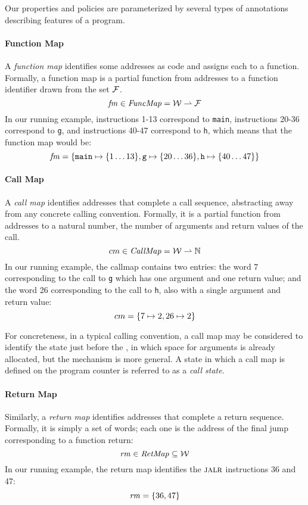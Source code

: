 \documentclass[acmsmall,review,anonymous]{acmart}\settopmatter{printfolios=true,printccs=false,printacmref=false}
\begin{document}
Our properties and policies are parameterized by several types of
annotations describing features of a program.

\paragraph*{Function Map}

A {\em function map} identifies some addresses as code and assigns
each to a function. Formally, a function map is a
partial function from addresses to a function
identifier drawn from the set \(\mathcal{F}\).
\[\mathit{fm} \in \mathit{FuncMap} = {\mathcal W} \rightharpoonup \mathcal{F}\]
%
In our running example, instructions 1-13 correspond to {\tt main},
instructions 20-36 correspond to {\tt g}, and instructions 40-47
correspond to {\tt h}, which means that the function map would be:
\[ \mathit{fm} = \{\texttt{main} \mapsto \{1\ldots13\}, \texttt{g} \mapsto \{20\ldots36\}, \texttt{h} \mapsto \{40\ldots47\}\}\]

\paragraph*{Call Map}

A {\em call map} identifies addresses that complete a call sequence,
abstracting away from any concrete calling convention. Formally, it is
a partial function from addresses to a natural number, the number of
arguments and return values of the call.
\[cm \in \mathit{CallMap} = {\mathcal W} \rightharpoonup \mathbb{N}\]
%
In our running example, the callmap contains two entries: the word 7
corresponding to the call to {\tt g} which has one argument and one
return value; and the word 26 corresponding to the call to {\tt h},
also with a single argument and return value:
\[ cm = \{ 7 \mapsto 2, 26 \mapsto 2\}\]

For concreteness, in a typical calling convention, a call map may be
considered to identify the state just before the \jal, in which
space for arguments is already allocated, but the mechanism is more
general. A state in which a call map is defined on the program counter
is referred to as a {\it call state}.

\paragraph*{Return Map}
Similarly, a {\em return map} identifies addresses that complete a
return sequence. Formally, it is simply a set of words; each one
is the address of the final jump corresponding to a function return:
%
\[\mathit{rm} \in \mathit{RetMap} \subseteq {\mathcal W}\]
%
In our running example, the return map identifies the $\textsc{jalr}$
instructions 36 and 47:
\[ \mathit{rm} = \{36, 47\} \]
\end{document}
